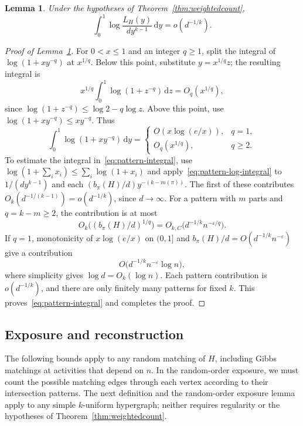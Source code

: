 \documentclass[11pt,reqno]{amsart}
\numberwithin{equation}{section}
\theoremstyle{plain}
\newtheorem{lemma}[theorem]{Lemma}
\theoremstyle{definition}
\newcommand{\eps}{\varepsilon}
\newcommand{\dd}{\,\mathrm d}
\begin{document}
\begin{lemma}\label{lem:integralbound}
    Under the hypotheses of Theorem~\ref{thm:weightedcount},
    \begin{equation}\label{eq:pattern-integral}
        \int_0^1\log\frac{L_H(y)}{dy^{k-1}}\dd y=o(d^{-1/k}).
    \end{equation}
\end{lemma}
\begin{proof}[Proof of Lemma~\ref{lem:integralbound}]
    For $0<x\le1$ and an integer $q\ge1$, split the integral of $\log(1+xy^{-q})$ at $x^{1/q}$.
    Below this point, substitute $y=x^{1/q}z$; the resulting integral is
    \[
        x^{1/q}\int_0^1\log(1+z^{-q})\dd z=O_q(x^{1/q}),
    \]
    since $\log(1+z^{-q})\le\log2-q\log z$.
    Above this point, use $\log(1+xy^{-q})\le xy^{-q}$.
    Thus
    \begin{equation}\label{eq:pattern-log-integral}
        \int_0^1\log(1+xy^{-q})\dd y
        =\begin{cases}
            O(x\log(e/x)),&q=1,\\
            O_q(x^{1/q}),&q\ge2.
        \end{cases}
    \end{equation}
    To estimate the integral in~\eqref{eq:pattern-integral}, use $\log(1+\sum_i x_i)\le\sum_i\log(1+x_i)$ and apply~\eqref{eq:pattern-log-integral} to $1/(dy^{k-1})$ and each $(b_\pi(H)/d)y^{-(k-m(\pi))}$.
    The first of these contributes $O_k(d^{-1/(k-1)})=o(d^{-1/k})$, since $d\to\infty$.
    For a pattern with $m$ parts and $q=k-m\ge2$, the contribution is at most
    \[
        O_k\bigl((b_\pi(H)/d)^{1/q}\bigr)
        =O_{k,C}\bigl(d^{-1/k}n^{-\eps/q}\bigr).
    \]
    If $q=1$, monotonicity of $x\log(e/x)$ on $(0,1]$ and $b_\pi(H)/d=O(d^{-1/k}n^{-\eps})$ give a contribution
    \[
        O\bigl(d^{-1/k}n^{-\eps}\log n\bigr),
    \]
    where simplicity gives $\log d=O_k(\log n)$.
    Each pattern contribution is $o(d^{-1/k})$, and there are only finitely many patterns for fixed $k$.
    This proves~\eqref{eq:pattern-integral} and completes the proof.
\end{proof}


\subsection{Exposure and reconstruction}\label{subsec:patternbounds}

The following bounds apply to any random matching of $H$, including Gibbs matchings at activities that depend on $n$.
In the random-order exposure, we must count the possible matching edges through each vertex according to their intersection patterns.
The next definition and the random-order exposure lemma apply to any simple $k$-uniform hypergraph; neither requires regularity or the hypotheses of Theorem~\ref{thm:weightedcount}.
\end{document}
